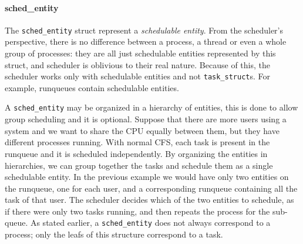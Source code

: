 \paragraph{sched\_entity}
The \verb|sched_entity| struct represent a \textit{schedulable entity}. From the scheduler's perspective, there is no difference between a process, a thread or even a whole group of processes: they are all just schedulable entities represented by this struct, and scheduler is oblivious to their real nature. Because of this, the scheduler works only with schedulable entities and not \verb|task_struct|s. For example, runqueues contain schedulable entities. 

A \verb|sched_entity| may be organized in a hierarchy of entities, this is done to allow group scheduling and it is optional. Suppose that there are more users using a system and we want to share the CPU equally between them, but they have different processes running. With normal CFS, each task is present in the runqueue and it is scheduled independently. By organizing the entities in hierarchies, we can group together the tasks and schedule them as a single schedulable entity. In the previous example we would have only two entities on the runqueue, one for each user, and a corresponding runqueue containing all the task of that user. The scheduler decides which of the two entities to schedule, as if there were only two tasks running, and then repeats the process for the sub-queue. As stated earlier, a \verb|sched_entity| does not always correspond to a process; only the leafs of this structure correspond to a task. 

